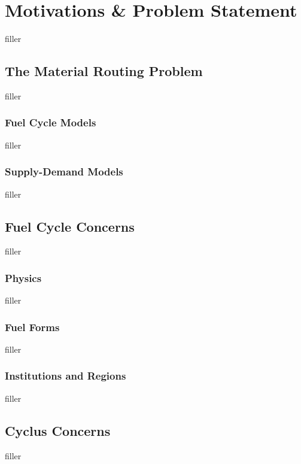 \section{Motivations \& Problem Statement}

filler

\subsection{The Material Routing Problem}

filler

\subsubsection{Fuel Cycle Models}

filler

\subsubsection{Supply-Demand Models}

filler

\subsection{Fuel Cycle Concerns}

filler

\subsubsection{Physics}

filler


\subsubsection{Fuel Forms}

filler


\subsubsection{Institutions and Regions}

filler


\subsection{Cyclus Concerns}

filler

